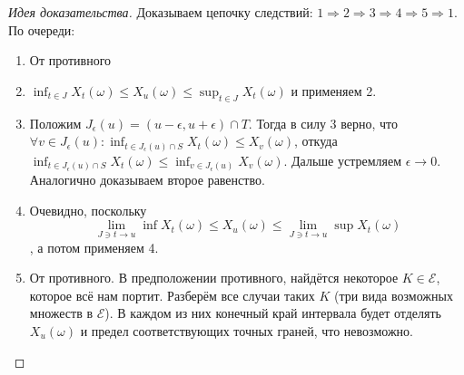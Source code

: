 \documentclass[16pt]{article}
\theoremstyle{definition}
\begin{document}
\begin{proof}[Идея доказательства]
Доказываем цепочку следствий: $1 \Longrightarrow 2 \Longrightarrow 3 \Longrightarrow 4 \Longrightarrow 5 \Longrightarrow 1$. По очереди:
\begin{enumerate}
    \item От противного
    \item $\inf_{t \in J}X_t(\omega) \le X_u(\omega) \le \sup_{t \in J}X_t(\omega)$ и применяем 2.
    \item Положим $J_\epsilon(u) = (u - \epsilon, u + \epsilon) \cap T$. Тогда в силу 3 верно, что $\forall v \in J_\epsilon(u): \inf_{t \in J_\epsilon(u) \cap S}X_t(\omega) \le X_v(\omega)$, откуда $\inf_{t \in J_\epsilon(u) \cap S}X_t(\omega) \le \inf_{v \in J_\epsilon(u)}X_v(\omega)$. Дальше устремляем $\epsilon \rightarrow 0$. Аналогично доказываем второе равенство.
    \item Очевидно, поскольку $$\lim_{J \ni t \rightarrow u} \inf X_t(\omega) \le X_u(\omega) \le \lim_{J \ni t \rightarrow u} \sup X_t(\omega)$$, а потом применяем 4.
    \item От противного. В предположении противного, найдётся некоторое $K \in \mathcal{E}$, которое всё нам портит. Разберём все случаи таких $K$ (три вида возможных множеств в $\mathcal{E}$). В каждом из них конечный край интервала будет отделять $X_u(\omega)$ и предел соответствующих точных граней, что невозможно.
\end{enumerate}
\end{proof}
\end{document}
